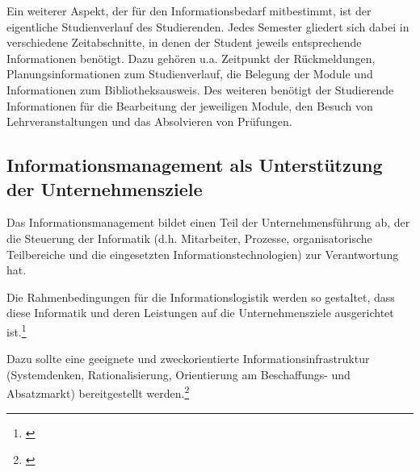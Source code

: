 Ein weiterer Aspekt, der für den Informationsbedarf mitbestimmt, ist der eigentliche Studienverlauf des Studierenden. Jedes Semester gliedert sich dabei in verschiedene Zeitabschnitte, in denen der Student jeweils entsprechende Informationen benötigt. Dazu gehören u.a. Zeitpunkt der Rückmeldungen, Planungsinformationen zum Studienverlauf, die Belegung der Module und Informationen zum Bibliotheksausweis. Des weiteren benötigt der Studierende Informationen für die Bearbeitung der jeweiligen Module, den Besuch von Lehrveranstaltungen und das Absolvieren von Prüfungen. 

\subsection{Informationsmanagement als Unterstützung der Unternehmensziele}
Das Informationsmanagement bildet einen Teil der Unternehmensführung ab, der die Steuerung der Informatik (d.h. Mitarbeiter, Prozesse, organisatorische Teilbereiche und die eingesetzten Informationstechnologien) zur Verantwortung hat.

Die Rahmenbedingungen für die Informationslogistik werden so gestaltet, dass diese Informatik und deren Leistungen auf die Unternehmensziele ausgerichtet ist.\footnote{\cite{voss_informationsmanagement_2001}}

Dazu sollte eine geeignete und zweckorientierte Informationsinfrastruktur (Systemdenken, Rationalisierung, Orientierung am Beschaffungs- und Absatzmarkt) bereitgestellt werden.\footnote{\cite{Bartels_ModulInformationsmanagement_2014}}

